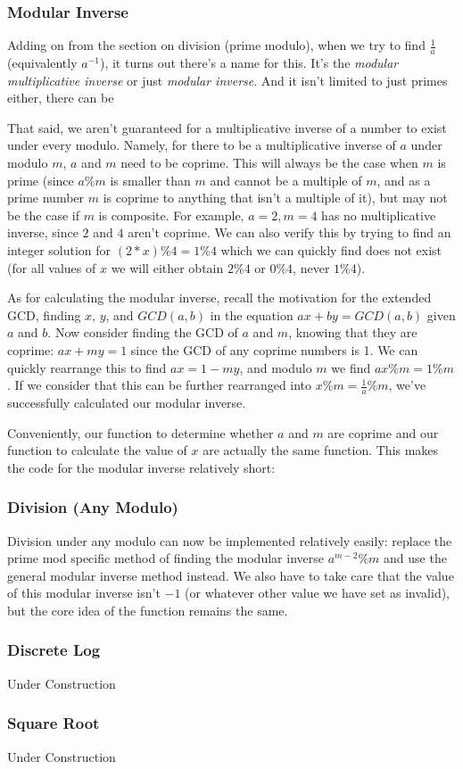 \subsubsection{Modular Inverse}

Adding on from the section on division (prime modulo), when we try to find $\frac{1}{a}$ (equivalently $a^{-1}$), it turns out there's a name for this. It's the \textit{modular multiplicative inverse} or just \textit{modular inverse}. And it isn't limited to just primes either, there can be 

That said, we aren't guaranteed for a multiplicative inverse of a number to exist under every modulo. Namely, for there to be a multiplicative inverse of $a$ under modulo $m$, $a$ and $m$ need to be coprime. This will always be the case when $m$ is prime (since $a \% m$ is smaller than $m$ and cannot be a multiple of $m$, and as a prime number $m$ is coprime to anything that isn't a multiple of it), but may not be the case if $m$ is composite. For example, $a = 2, m = 4$ has no multiplicative inverse, since $2$ and $4$ aren't coprime. We can also verify this by trying to find an integer solution for $(2 * x) \% 4 = 1 \% 4$ which we can quickly find does not exist (for all values of $x$ we will either obtain $2 \% 4$ or $0 \% 4$, never $1 \% 4$).

As for calculating the modular inverse, recall the motivation for the extended GCD, finding $x$, $y$, and $GCD(a,b)$ in the equation $ax + by = GCD(a,b)$ given $a$ and $b$. Now consider finding the GCD of $a$ and $m$, knowing that they are coprime: $ax + my = 1$ since the GCD of any coprime numbers is 1. We can quickly rearrange this to find $ax = 1 - my$, and modulo $m$ we find $ax \% m = 1 \% m$. If we consider that this can be further rearranged into $x \% m = \frac{1}{a} \% m$, we've successfully calculated our modular inverse.

Conveniently, our function to determine whether $a$ and $m$ are coprime and our function to calculate the value of $x$ are actually the same function. This makes the code for the modular inverse relatively short:


\subsubsection{Division (Any Modulo)}

Division under any modulo can now be implemented relatively easily: replace the prime mod specific method of finding the modular inverse $a^{m-2}\%m$ and use the general modular inverse method instead. We also have to take care that the value of this modular inverse isn't $-1$ (or whatever other value we have set as invalid), but the core idea of the function remains the same.

\subsubsection{Discrete Log}

Under Construction

\subsubsection{Square Root}

Under Construction

\hrulefill

